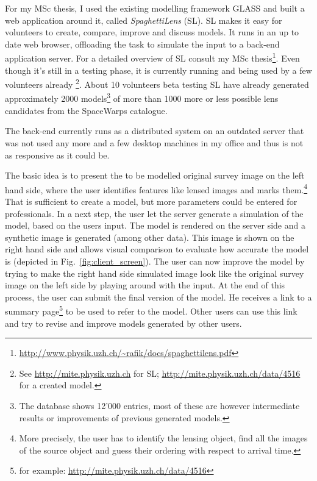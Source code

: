 \documentclass[11pt]{article}
\begin{document}
For my MSc thesis\cite{mscth}, I used the existing modelling framework GLASS\cite{glass2, glass} and built a web application around it, called \emph{SpaghettiLens} (SL).
SL makes it easy for volunteers to create, compare, improve and discuss models.
It runs in an up to date web browser, offloading the task to simulate the input to a back-end application server.
For a detailed overview of SL consult my MSc thesis\footnote{\url{http://www.physik.uzh.ch/~rafik/docs/spaghettilens.pdf}}.
Even though it's still in a testing phase, it is currently running and being used by a few volunteers already
\footnote{See \url{http://mite.physik.uzh.ch} for SL; \url{http://mite.physik.uzh.ch/data/4516} for a created model.}.
About 10 volunteers beta testing SL have already generated approximately 2000 models\footnote{The database shows 12'000 entries, most of these are however intermediate results or improvements of previous generated models.} of more than 1000 more or less possible lens candidates from the SpaceWarps catalogue.

The back-end currently runs as a distributed system on an outdated server that was not used any more and a few desktop machines in my office and thus is not as responsive as it could be.

The basic idea is to present the to be modelled original survey image on the left hand side, where the user identifies features like lensed images and marks them.\footnote{More precisely, the user has to identify the lensing object, find all the images of the source object and guess their ordering with respect to arrival time.}
That is sufficient to create a model, but more parameters could be entered for professionals.
In a next step, the user let the server generate a simulation of the model, based on the users input.
The model is rendered on the server side and a synthetic image is generated (among other data).
This image is shown on the right hand side and allows visual comparison to evaluate how accurate the model is (depicted in Fig.~\ref{fig:client_screen}).
The user can now improve the model by trying to make the right hand side simulated image look like the original survey image on the left side by playing around with the input.
At the end of this process, the user can submit the final version of the model.
He receives a link to a summary page\footnote{for example: \url{http://mite.physik.uzh.ch/data/4516}} to be used to refer to the model.
Other users can use this link and try to revise and improve models generated by other users.
\end{document}
